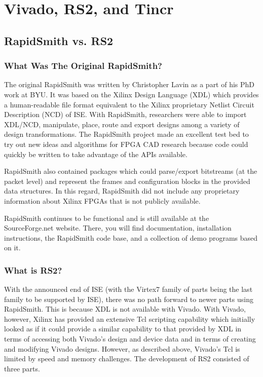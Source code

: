 \documentclass[10pt]{article}
\begin{document}
\pagebreak
\section{Vivado, RS2, and Tincr}
\subsection{RapidSmith vs. RS2}
\subsubsection{What Was The Original RapidSmith?}
The original RapidSmith was written by Christopher Lavin as a part of his PhD
work at BYU.  It was based on the Xilinx Design Language (XDL) which provides a
human-readable file format equivalent to the Xilinx proprietary Netlist Circuit
Description (NCD) of ISE.  With RapidSmith, researchers were able to import
XDL/NCD, manipulate, place, route and export designs among a variety of design
transformations.  The RapidSmith project made an excellent test bed to try out
new ideas and algorithms for FPGA CAD research because code could quickly be
written to take advantage of the APIs available.

RapidSmith also contained packages which could parse/export bitstreams (at the
packet level) and represent the frames and configuration blocks in the provided
data structures.  In this regard, RapidSmith did not include any proprietary
information about Xilinx FPGAs that is not publicly available.

RapidSmith continues to be functional and is still available at the
SourceForge.net website.  There, you will find documentation, installation
instructions, the RapidSmith code base, and a collection of demo programs based
on it.

\subsubsection{What is RS2?}
With the announced end of ISE (with the Virtex7 family of parts being the last
family to be supported by ISE), there was no path forward to newer parts using
RapidSmith.  This is because XDL is not available with Vivado. With
Vivado, however, Xilinx has provided an extensive Tcl scripting capability which 
initially looked as if it could provide a similar capability to that provided by
XDL in terms of accessing both Vivado's design and device data and in terms of
creating and modifying Vivado designs.  However, as described above, Vivado's
Tcl is limited by speed and memory challenges.
The development of RS2 consisted of three parts.
\end{document}
